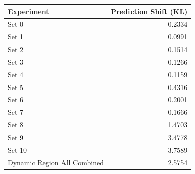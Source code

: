 \begin{tabular}{lr}
\toprule
Experiment & Prediction Shift (KL) \\
\midrule
Set 0 & 0.2334 \\
Set 1 & 0.0991 \\
Set 2 & 0.1514 \\
Set 3 & 0.1266 \\
Set 4 & 0.1159 \\
Set 5 & 0.4316 \\
Set 6 & 0.2001 \\
Set 7 & 0.1666 \\
Set 8 & 1.4703 \\
Set 9 & 3.4778 \\
Set 10 & 3.7589 \\
Dynamic Region All Combined & 2.5754 \\
\bottomrule
\end{tabular}
